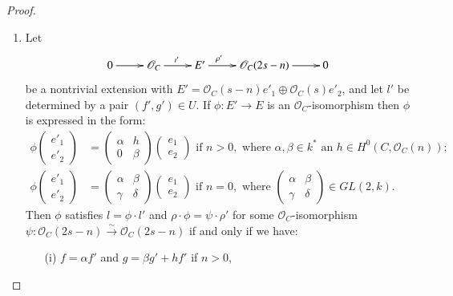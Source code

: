 \begin{proof}
\begin{enumerate}
\item Let
\[
\xymatrix{0\ar[r]& \mathscr{O}_{C} \ar[r]^{\imath'} & E' \ar[r]^(.3){\rho'} &
  \mathscr{O}_{C}(2s-n) \ar[r] & 0} 
\]
be a nontrivial extension with $E'=\mathscr{O}_{C}(s-n)e'_{1}\oplus
\mathscr{O}_{C}(s)e'_{2}$, and let $l'$ be determined by a pair
$(f',g')\in U$. If $\phi:E'\to E$ is an $\mathscr{O}_{C}$-isomorphism
then $\phi$ is expressed in the form:
\begin{align*}
\phi
\begin{pmatrix}
e'_{1}\\
e'_{2}
\end{pmatrix}
&= \begin{pmatrix}
\alpha & h\\
0 &\beta
\end{pmatrix}
\begin{pmatrix}
e_{1}\\
e_{2}
\end{pmatrix}
\text{ \ if } n>0, \text{ where } \alpha,\beta\in k^{\ast}\text{ an }
h\in H^{0}(C,\mathscr{O}_{C}(n));\\
\phi
\begin{pmatrix}
e'_{1}\\
e'_{2}
\end{pmatrix}
&= \begin{pmatrix}
\alpha & \beta\\
\gamma &\delta
\end{pmatrix}
\begin{pmatrix}
e_{1}\\
e_{2}
\end{pmatrix}
\text{ \ if } n=0,\text{ where }
\begin{pmatrix}
\alpha & \beta\\
\gamma & \delta
\end{pmatrix}
\in GL(2,k).
\end{align*}
Then $\phi$ satisfies $l=\phi\cdot l'$ and $\rho\cdot\phi=\psi\cdot
\rho'$ for some $\mathscr{O}_{C}$-isomorphism\pageoriginale\
$\psi:\mathscr{O}_{C}(2s-n)\xrightarrow{\sim}\mathscr{O}_{C}(2s-n)$ if
and only if we have:
\begin{itemize}
\item[(i)] $f=\alpha f'$ and $g=\beta g'+hf'$ if $n>0$,


\end{itemize}
\end{enumerate}
\end{proof}

